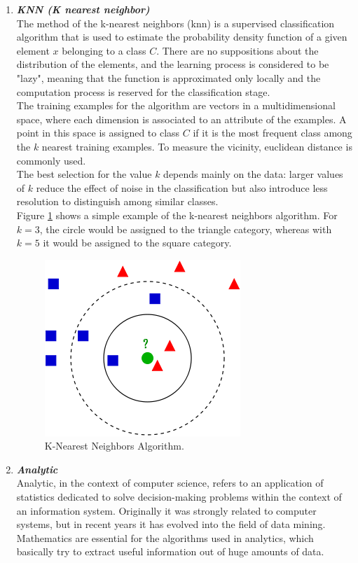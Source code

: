 \documentclass{article}
\begin{document}
\begin{enumerate}[label=(\alph*)]
\begin{enumerate}[label=\textbf{\arabic*.}]
            \item \textbf{\textit{KNN (K nearest neighbor)}}\\
The method of the k-nearest neighbors (knn) is a supervised classification algorithm that is used to estimate the probability density function of a given element $x$ belonging to a class $C$. There are no suppositions about the distribution of the elements, and the learning process is considered to be "lazy", meaning that the function is approximated only locally and the computation process is reserved for the classification stage.\\
The training examples for the algorithm are vectors in a multidimensional space, where each dimension is associated to an attribute of the examples. A point in this space is assigned to class $C$ if it is the most frequent class among the $k$ nearest training examples. To measure the vicinity, euclidean distance is commonly used.\\
The best selection for the value $k$ depends mainly on the data: larger values of $k$ reduce the effect of noise in the classification but also introduce less resolution to distinguish among similar classes.\\
Figure \ref{knn} shows a simple example of the k-nearest neighbors algorithm. For $k = 3$, the circle would be assigned to the triangle category, whereas with $k=5$ it would be assigned to the square category.
	\begin{figure}[ht]
		\centering
		\includegraphics[width=0.5\linewidth]{knn.png}
		\caption{K-Nearest Neighbors Algorithm.}
		\label{knn}
	\end{figure}
	
            \item \textbf{\textit{Analytic}}\\
Analytic, in the context of computer science, refers to an application of statistics dedicated to solve decision-making problems within the context of an information system. Originally it was strongly related to computer systems, but in recent years it has evolved into the field of data mining. Mathematics are essential for the algorithms used in analytics, which basically try to extract useful information out of huge amounts of data.


\end{enumerate}
\end{enumerate}
\end{document}
